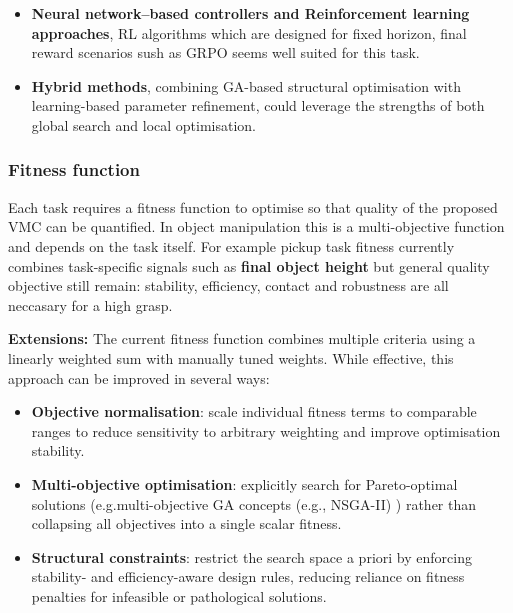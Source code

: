 \documentclass[12pt,a4paper,twocolumn]{article}
\begin{document}
\begin{itemize}
    \item \textbf{Neural network--based controllers and Reinforcement learning approaches}, RL algorithms which are designed for fixed horizon, final reward scenarios sush as GRPO \cite{yuan2024grpo} seems well suited for this task.
    \item \textbf{Hybrid methods}, combining GA-based structural optimisation with learning-based parameter refinement, could leverage the strengths of both global search and local optimisation.
\end{itemize}



\subsubsection{Fitness function}
Each task requires a fitness function to optimise so that quality of the proposed VMC can be quantified. In object manipulation \cite{sahbani2012grasp} this is a multi-objective function and depends on the task itself.
For example pickup task fitness currently combines task-specific signals such as \textbf{final object height} but general quality objective still remain: stability, efficiency, contact and robustness are all neccasary for a high grasp.
    
\textbf{Extensions:} The current fitness function combines multiple criteria using a linearly weighted sum with manually tuned weights. While effective, this approach can be improved in several ways:

\begin{itemize}
    \item \textbf{Objective normalisation}: scale individual fitness terms to comparable ranges to reduce sensitivity to arbitrary weighting and improve optimisation stability.
    \item \textbf{Multi-objective optimisation}: explicitly search for Pareto-optimal solutions (e.g.multi-objective GA concepts (e.g., NSGA-II) \citep{deb2002nsga2}) rather than collapsing all objectives into a single scalar fitness.
    \item \textbf{Structural constraints}: restrict the search space a priori by enforcing stability- and efficiency-aware design rules, reducing reliance on fitness penalties for infeasible or pathological solutions.
\end{itemize}
\end{document}
